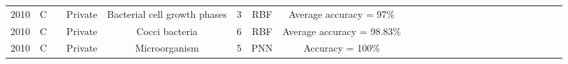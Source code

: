 \begin{landscape}
\begin{longtable}{cccccccccccccccccccccccc}
2010 & C    & \cite{Hiremath-2010-AICB}     & Private          & Bacterial cell growth phases                   & 3                & RBF                                                            & Average accuracy = 97\%                                                                                                                                                           \\


2010 & C    & \cite{Hiremath-2010-DIAC}     & Private          & Cocci bacteria                                 & 6                & RBF                                                            & Average accuracy = 98.83\%                                                                                                                                                        \\
2010 & C    & \cite{Kumar-2010-RDMU}        & Private          & Microorganism                                  & 5                & PNN                                                            & Accuracy = 100\%                                                                                                                                                                  \\


\end{longtable}
\end{landscape}
